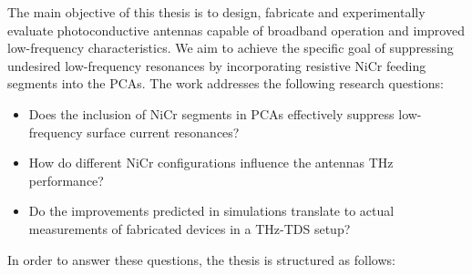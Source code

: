 The main objective of this thesis is to design, fabricate and experimentally evaluate photoconductive antennas capable of broadband operation and improved low-frequency characteristics. We aim to achieve the specific goal of suppressing undesired low-frequency resonances by incorporating resistive NiCr feeding segments into the PCAs. The work addresses the following research questions: 
\begin{itemize}
    \item Does the inclusion of NiCr segments in PCAs effectively suppress low-frequency surface current resonances?
    \item How do different NiCr configurations influence the antennas THz performance?
    \item Do the improvements predicted in simulations translate to actual measurements of fabricated devices in a THz-TDS setup?
\end{itemize}

In order to answer these questions, the thesis is structured as follows:




